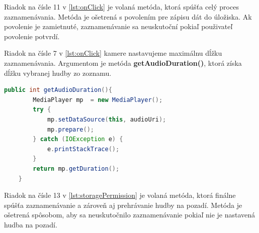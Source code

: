 \documentclass[12pt, oneside]{book}
\begin{document}
\begin{figure}[H]

\end{figure}


Riadok na čísle 11 v \autoref{lst:onClick} je volaná metóda, ktorá spúšťa celý proces zaznamenávania. Metóda je ošetrená s povolením pre zápisu dát do úložiska. Ak povolenie je zamietnuté, zaznamenávanie sa neuskutoční pokiaľ použivateľ povolenie potvrdí.

Riadok na čísle 7 v \autoref{lst:onClick} kamere nastavujeme maximálnu dĺžku zaznamenávania. Argumentom je metóda \textbf{getAudioDuration()}, ktorá získa dĺžku vybranej hudby zo zoznamu. 

\begin{lstlisting}[language=Java, caption=Príklad metódy pre získanie dĺžky súborového média. , label={lst:getAudioDuration} ]
public int getAudioDuration(){
        MediaPlayer mp  = new MediaPlayer();
        try {
            mp.setDataSource(this, audioUri);
            mp.prepare();
        } catch (IOException e) {
            e.printStackTrace();
        }
        return mp.getDuration();
    }
\end{lstlisting}


\begin{figure}[H]

\end{figure}

Riadok na čísle 13 v \autoref{lst:storagePermission} je volaná metóda, ktorá finálne spúšťa zaznamenávanie a zároveň aj prehrávanie hudby na pozadí. Metóda je ošetrená spôsobom, aby sa neuskutočnilo zaznamenávanie pokiaľ nie je nastavená hudba na pozadí.

\begin{figure}[H]

\end{figure}
\end{document}
